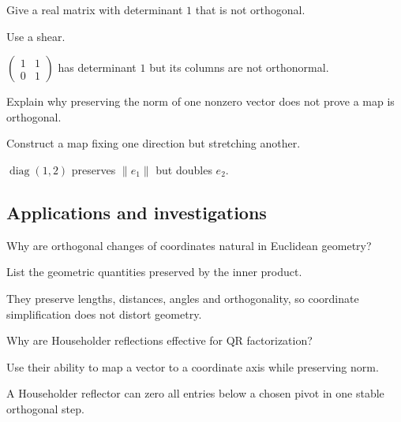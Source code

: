 \begin{exercise}\label{exr:i15-expand-11}
Give a real matrix with determinant \(1\) that is not orthogonal.
\end{exercise}
\begin{hint}
Use a shear.
\end{hint}
\begin{solution}
\(\begin{pmatrix}1&1\\0&1\end{pmatrix}\) has determinant \(1\) but its columns are not orthonormal.
\end{solution}

\begin{exercise}\label{exr:i15-expand-12}
Explain why preserving the norm of one nonzero vector does not prove a map is orthogonal.
\end{exercise}
\begin{hint}
Construct a map fixing one direction but stretching another.
\end{hint}
\begin{solution}
\(\operatorname{diag}(1,2)\) preserves \(\|e_1\|\) but doubles \(e_2\).
\end{solution}

\subsection*{Applications and investigations}

\begin{exercise}\label{exr:i15-expand-13}
Why are orthogonal changes of coordinates natural in Euclidean geometry?
\end{exercise}
\begin{hint}
List the geometric quantities preserved by the inner product.
\end{hint}
\begin{solution}
They preserve lengths, distances, angles and orthogonality, so coordinate simplification does not distort geometry.
\end{solution}

\begin{exercise}[Householder QR]\label{exr:i15-expand-14}
Why are Householder reflections effective for QR factorization?
\end{exercise}
\begin{hint}
Use their ability to map a vector to a coordinate axis while preserving norm.
\end{hint}
\begin{solution}
A Householder reflector can zero all entries below a chosen pivot in one stable orthogonal step.
\end{solution}

